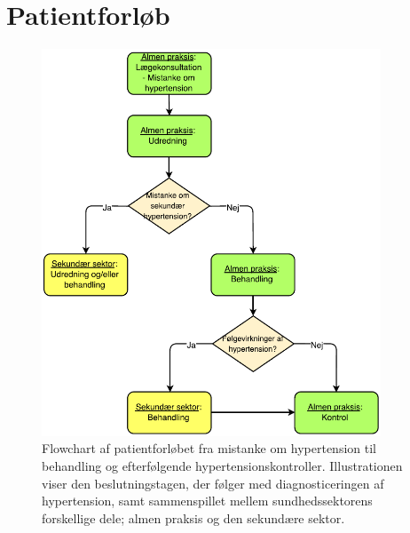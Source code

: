 \chapter{Patientforløb}

\begin{figure}[H]
\centering
\includegraphics[width=0.9\textwidth]{figures/patientforloeb2}
\caption{Flowchart af patientforløbet fra mistanke om hypertension til behandling og efterfølgende hypertensionskontroller. Illustrationen viser den beslutningstagen, der følger med diagnosticeringen af hypertension, samt sammenspillet mellem sundhedssektorens forskellige dele; almen praksis og den sekundære sektor.}
\label{fig:patientforloeb}
\end{figure}